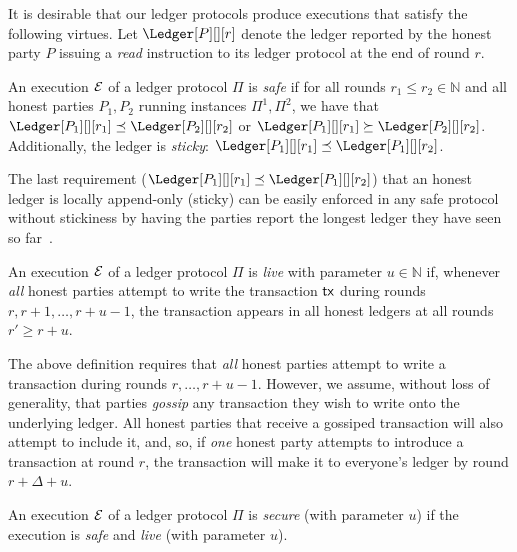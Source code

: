 It is desirable that our
ledger protocols produce executions that satisfy the following virtues.
Let $\Ledger[P][][r]$ denote the ledger reported by the honest party $P$
issuing a \emph{read} instruction to its ledger protocol at the end of round $r$.

\begin{definition}[Safe]
  An execution $\mathcal{E}$ of a ledger protocol $\Pi$ is \emph{safe} if for all rounds $r_1 \leq r_2 \in \mathbb{N}$
  and all honest parties $P_1, P_2$ running instances $\Pi^1, \Pi^2$,
  we have that
  $\Ledger[P_1][][r_1] \preceq \Ledger[P_2][][r_2]$ or
  $\Ledger[P_1][][r_1] \succeq \Ledger[P_2][][r_2]$.
  Additionally, the ledger is \emph{sticky}: $\Ledger[P_1][][r_1] \preceq \Ledger[P_1][][r_2]$.
\end{definition}

The last requirement ($\Ledger[P_1][][r_1] \preceq \Ledger[P_1][][r_2]$)
that an honest ledger is locally append-only (sticky) can be easily enforced
in any safe protocol without stickiness by having the parties report the longest ledger they have seen so far~\cite{streamlet}.

\begin{definition}[Live]
  An execution $\mathcal{E}$ of a ledger protocol $\Pi$ is \emph{live} with parameter $u \in \mathbb{N}$ if, whenever
  \emph{all} honest parties attempt to write the transaction $\textsf{tx}$ during
  rounds $r, r + 1, \ldots, r + u - 1$, the transaction appears in all
  honest ledgers at all rounds $r' \geq r + u$.
\end{definition}

The above definition requires that \emph{all} honest parties attempt to
write a transaction during rounds $r, \ldots, r + u - 1$. However, we
assume, without loss of generality,
that parties \emph{gossip} any transaction they wish to write onto
the underlying ledger. All honest parties that receive a gossiped transaction
will also attempt to include it, and, so, if \emph{one} honest party
attempts to introduce a transaction at round $r$, the transaction will
make it to everyone's ledger by round $r + \Delta + u$.

\begin{definition}
  An execution $\mathcal{E}$ of a ledger protocol $\Pi$ is \emph{secure} (with parameter $u$) if the execution
  is \emph{safe} and \emph{live} (with parameter $u$).
\end{definition}
